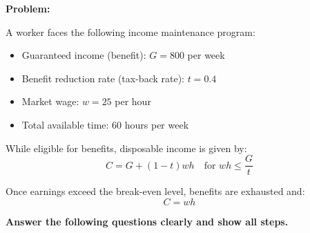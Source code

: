 \documentclass[12pt]{article}
\begin{document}
\begin{large}
\textbf{
Problem:}
\end{large}

\vspace{1em}

A worker faces the following income maintenance program:

\begin{itemize}
\item Guaranteed income (benefit): $G = 800$ per week
\item Benefit reduction rate (tax-back rate): $t = 0.4$
\item Market wage: $w = 25$ per hour
\item Total available time: 60 hours per week
\end{itemize}

While eligible for benefits, disposable income is given by:
\[
C = G + (1 - t)wh
\quad \text{for } wh \leq \frac{G}{t}
\]

Once earnings exceed the break-even level, benefits are exhausted and:
\[
C = wh
\]

\vspace{1em}

\textbf{Answer the following questions clearly and show all steps.}
\end{document}
